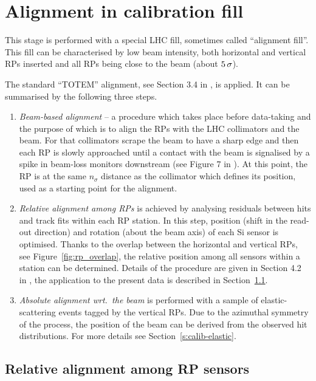 \documentclass[TOTEM]{cern/cernphprep}
\def\un#1{\,{\rm #1}}
\begin{document}
\section{Alignment in calibration fill}
\label{s:calib}

This stage is performed with a special LHC fill, sometimes called ``alignment fill''. This fill can be characterised by low beam intensity, both horizontal and vertical RPs inserted and all RPs being close to the beam (about $5\un{\sigma}$).

The standard ``TOTEM'' alignment, see Section 3.4 in \cite{totem-ijmp}, is applied. It can be summarised by the following three steps.
\begin{enumerate}[nosep]
\item {\em Beam-based alignment} -- a procedure which takes place before data-taking and the purpose of which is to align the RPs with the LHC collimators and the beam. For that collimators scrape the beam to have a sharp edge and then each RP is slowly approached until a contact with the beam is signalised by a spike in beam-loss monitors downstream (see Figure 7 in \cite{totem-ijmp}). At this point, the RP is at the same $n_\sigma$ distance as the collimator which defines its position, used as a starting point for the alignment.
\item {\em Relative alignment among RPs} is achieved by analysing residuals between hits and track fits within each RP station. In this step, position (shift in the read-out direction) and rotation (about the beam axis) of each Si sensor is optimised. Thanks to the overlap between the horizontal and vertical RPs, see Figure~\ref{fig:rp_overlap}, the relative position among all sensors within a station can be determined. Details of the procedure are given in Section 4.2 in \cite{jan_thesis}, the application to the present data is described in Section~\ref{s:calib-track}.
\item {\em Absolute alignment wrt.~the beam} is performed with a sample of elastic-scattering events tagged by the vertical RPs. Due to the azimuthal symmetry of the process, the position of the beam can be derived from the observed hit distributions. For more details see Section~\ref{s:calib-elastic}.
\end{enumerate}

\subsection{Relative alignment among RP sensors}
\label{s:calib-track}
\end{document}

